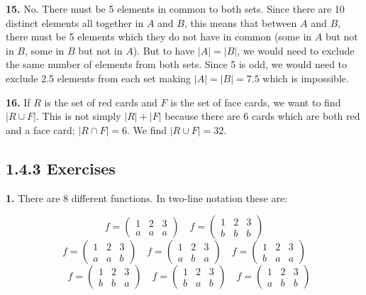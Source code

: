 \documentclass[10pt,]{book}
\theoremstyle{plain}
\theoremstyle{definition}
\theoremstyle{definition}
\theoremstyle{definition}
\numberwithin{equation}{section}
\newcommand{\amp}{ & }
\begin{document}
\par\smallskip
\noindent\textbf{15.}\quad{}
          No. There must be 5 elements in common to both sets. Since there are 10 distinct elements all together in \(A\) and \(B\), this means that between \(A\) and \(B\), there must be 5 elements which they do not have in common (some in \(A\) but not in \(B\), some in \(B\) but not in \(A\)). But to have \(|A| = |B|\), we would need to exclude the same number of elements from both sets.  Since 5 is odd, we would need to exclude 2.5 elements from each set making \(|A| = |B| = 7.5\) which is impossible.
\par\smallskip
\noindent\textbf{16.}\quad{}
          If \(R\) is the set of red cards and \(F\) is the set of face cards, we want to find \(|R \cup F|\). This is not simply \(|R| + |F|\) because there are 6 cards which are both red and a face card; \(|R \cap F| = 6\). We find
          \(|R \cup F| = 32\).
\par\smallskip
\subsection*{1.4.3 Exercises}
\noindent\textbf{1.}\quad{}
            There are 8 different functions. In two-line notation these are:

            
              \begin{equation*} f = \begin{pmatrix} 1 \amp 2 \amp 3 \\ a \amp a\amp a \end{pmatrix} \quad f = \begin{pmatrix} 1 \amp 2 \amp 3 \\ b \amp b \amp b \end{pmatrix}\end{equation*}
              \begin{equation*} f = \begin{pmatrix} 1 \amp 2 \amp 3 \\ a \amp a\amp b \end{pmatrix} \quad f = \begin{pmatrix} 1 \amp 2 \amp 3 \\ a \amp b \amp a \end{pmatrix} \quad f = \begin{pmatrix} 1 \amp 2 \amp 3 \\ b \amp a\amp a \end{pmatrix}
              \end{equation*}
              \begin{equation*}
                \quad f = \begin{pmatrix} 1 \amp 2 \amp 3 \\ b \amp b \amp a \end{pmatrix} \quad f = \begin{pmatrix} 1 \amp 2 \amp 3 \\ b \amp a\amp b \end{pmatrix} \quad f = \begin{pmatrix} 1 \amp 2 \amp 3 \\ a \amp b \amp b \end{pmatrix} \end{equation*}
\end{document}

